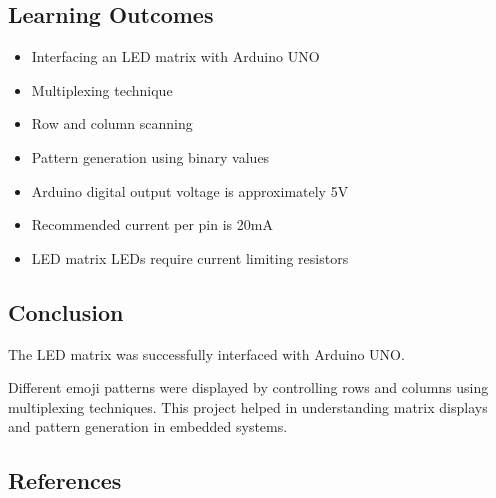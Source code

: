 
\subsection{Learning Outcomes}

\begin{itemize}

\item Interfacing an LED matrix with Arduino UNO

\item Multiplexing technique

\item Row and column scanning

\item Pattern generation using binary values

\item Arduino digital output voltage is approximately 5V

\item Recommended current per pin is 20mA

\item LED matrix LEDs require current limiting resistors

\end{itemize}


\subsection{Conclusion}

The LED matrix was successfully interfaced with Arduino UNO.

Different emoji patterns were displayed by controlling rows and columns using multiplexing techniques. This project helped in understanding matrix displays and pattern generation in embedded systems.


\subsection{References}

